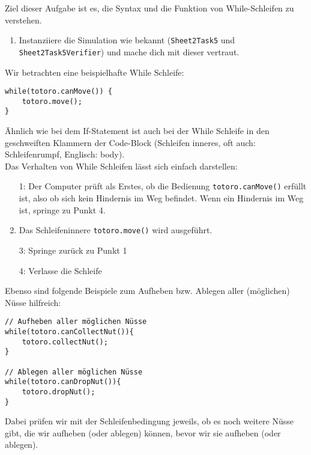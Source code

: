 

Ziel dieser Aufgabe ist es, die Syntax und die Funktion von While-Schleifen zu verstehen.

\begin{enumerate}
    \item Instanziiere die Simulation wie bekannt (\lstinline{Sheet2Task5} und \lstinline{Sheet2Task5Verifier}) und mache dich mit dieser vertraut.
\end{enumerate}


\begin{Infobox}
    Wir betrachten eine beispielhafte While Schleife:

    \begin{lstlisting}[breaklines=true, numbers=none]
while(totoro.canMove()) {
    totoro.move();
}
    \end{lstlisting}

    Ähnlich wie bei dem If-Statement ist auch bei der While Schleife in den geschweiften Klammern der Code-Block (Schleifen inneres, oft auch: Schleifenrumpf, Englisch: body).\\

    Das Verhalten von While Schleifen lässt sich einfach darstellen:
    \begin{enumerate}
        \item[1:] Der Computer prüft als Erstes, ob die Bedienung \lstinline{totoro.canMove()} erfüllt ist, also ob sich kein Hindernis im Weg befindet. Wenn ein Hindernis im Weg ist, springe zu Punkt 4.
        \item[2:] Das Schleifeninnere \lstinline{totoro.move()} wird ausgeführt.
        \item[3:] Springe zurück zu Punkt 1
        \item[4:] Verlasse die Schleife
    \end{enumerate}

    Ebenso sind folgende Beispiele zum Aufheben bzw. Ablegen aller (möglichen) Nüsse hilfreich:

    \begin{lstlisting}[breaklines=true, numbers=none]
// Aufheben aller möglichen Nüsse
while(totoro.canCollectNut()){
    totoro.collectNut();
}

// Ablegen aller möglichen Nüsse
while(totoro.canDropNut()){
    totoro.dropNut();
}
    \end{lstlisting}

    Dabei prüfen wir mit der Schleifenbedingung jeweils, ob es noch weitere Nüsse gibt, die wir aufheben (oder ablegen) können, bevor wir sie aufheben (oder ablegen).
\end{Infobox}


